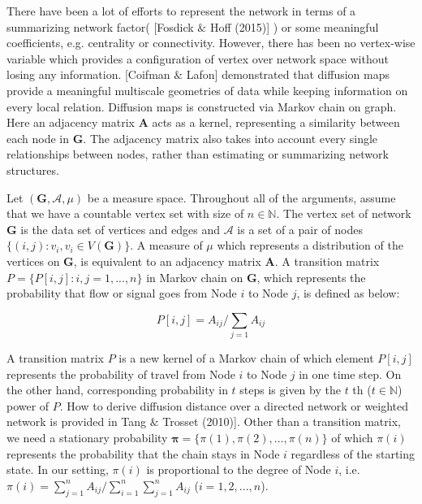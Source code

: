 \documentclass[12pt]{article}
\theoremstyle{definition}
\begin{document}
There have been a lot of efforts to represent the network in terms of a summarizing network factor( [Fosdick $\&$ Hoff (2015)] ) or some meaningful coefficients, e.g. centrality or connectivity. However, there has been no vertex-wise variable which provides a configuration of vertex over network space without losing any information. [Coifman $\&$ Lafon] demonstrated that diffusion maps provide a meaningful multiscale geometries of data while keeping information on every local relation. Diffusion maps is constructed via Markov chain on graph. Here an adjacency matrix $\boldsymbol{A}$ acts as a kernel, representing a similarity between each node in $\boldsymbol{G}$. The adjacency matrix also takes into account every single relationships between nodes, rather than estimating or summarizing network structures.

Let $(\boldsymbol{G}, \mathcal{A}, \mu)$ be a measure space. Throughout all of the arguments, assume that we have a countable vertex set with size of $n \in \mathbb{N}$. The vertex set of network $\boldsymbol{G}$ is the data set of vertices and edges and $\mathcal{A}$ is a set of a pair of nodes $\{(i,j) : v_{i}, v_{i} \in V(\boldsymbol{G}) \}$. A measure of $\mu$ which represents a distribution of the vertices on $\boldsymbol{G}$, is equivalent to an adjacency matrix $\boldsymbol{A}$. A transition matrix $P = \{P[i,j] : i,j=1,...,n \}$ in Markov chain on $\boldsymbol{G}$, which represents the probability that flow or signal goes from Node $i$ to Node $j$, is defined as below:

\begin{equation}
P[i,j] = A_{ij} \big/ \sum\limits_{j=1} A_{ij}
\end{equation}

A transition matrix $P$ is a new kernel of a Markov chain of which element $P[i,j]$ represents the probability of travel from Node $i$ to Node $j$ in one time step. On the other hand, corresponding probability in $t$ steps is given by the $t$ th ($t \in \mathbb{N}$) power of $P$. How to derive diffusion distance over a directed network or weighted network is provided in Tang $\&$ Trosset (2010)]. Other than a transition matrix, we need a stationary probability $\boldsymbol{\pi} = \{\pi(1), \pi(2), ... , \pi(n) \}$ of which $\pi(i)$ represents the probability that the chain stays in Node $i$ regardless of the starting state. In our setting, $\pi(i)$ is proportional to the degree of Node $i$, i.e. $\pi(i) = \sum\limits_{j=1}^{n} A_{ij} \big/ \sum\limits_{i=1}^{n}\sum\limits_{j=1}^{n} A_{ij}$ ($i=1,2,..., n$).   
\end{document}
